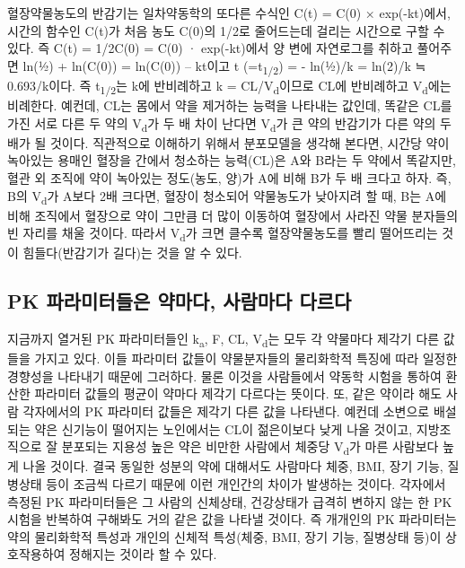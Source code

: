 \documentclass[
  11pt,
  krantz2, a4paper, twoside]{krantz}
\theoremstyle{definition}
\theoremstyle{definition}
\theoremstyle{definition}
\theoremstyle{definition}
\theoremstyle{remark}
\begin{document}
혈장약물농도의 반감기는 일차약동학의 또다른 수식인 C(t) = C(0) × exp(-kt)에서, 시간의 함수인 C(t)가 처음 농도 C(0)의 1/2로 줄어드는데 걸리는 시간으로 구할 수 있다. 
즉 C(t) = 1/2C(0) = C(0) · exp(-kt)에서 양 변에 자연로그를 취하고 풀어주면 ln(½) + ln(C(0)) = ln(C(0)) -- kt이고 t (=t\textsubscript{1/2}) = - ln(½)/k = ln(2)/k ≒ 0.693/k이다.
즉 t\textsubscript{1/2}는 k에 반비례하고 k = CL/V\textsubscript{d}이므로 CL에 반비례하고 V\textsubscript{d}에는 비례한다.
예컨데, CL는 몸에서 약을 제거하는 능력을 나타내는 값인데, 똑같은 CL를 가진 서로 다른 두 약의 V\textsubscript{d}가 두 배 차이 난다면 V\textsubscript{d}가 큰 약의 반감기가 다른 약의 두 배가 될 것이다. 
직관적으로 이해하기 위해서 분포모델을 생각해 본다면, 시간당 약이 녹아있는 용매인 혈장을 간에서 청소하는 능력(CL)은 A와 B라는 두 약에서 똑같지만, 혈관 외 조직에 약이 녹아있는 정도(농도, 양)가 A에 비해 B가 두 배 크다고 하자.
즉, B의 V\textsubscript{d}가 A보다 2배 크다면, 혈장이 청소되어 약물농도가 낮아지려 할 때, B는 A에 비해 조직에서 혈장으로 약이 그만큼 더 많이 이동하여 혈장에서 사라진 약물 분자들의 빈 자리를 채울 것이다.
따라서 V\textsubscript{d}가 크면 클수록 혈장약물농도를 빨리 떨어뜨리는 것이 힘들다(반감기가 길다)는 것을 알 수 있다.

\hypertarget{pk-uxd30cuxb77cuxbbf8uxd130uxb4e4uxc740-uxc57duxb9c8uxb2e4-uxc0acuxb78cuxb9c8uxb2e4-uxb2e4uxb974uxb2e4}{%
\subsection{PK 파라미터들은 약마다, 사람마다 다르다}\label{pk-uxd30cuxb77cuxbbf8uxd130uxb4e4uxc740-uxc57duxb9c8uxb2e4-uxc0acuxb78cuxb9c8uxb2e4-uxb2e4uxb974uxb2e4}}

지금까지 열거된 PK 파라미터들인 k\textsubscript{a}, F, CL, V\textsubscript{d}는 모두 각 약물마다 제각기 다른 값들을 가지고 있다.
이들 파라미터 값들이 약물분자들의 물리화학적 특징에 따라 일정한 경향성을 나타내기 때문에 그러하다.
물론 이것을 사람들에서 약동학 시험을 통하여 환산한 파라미터 값들의 평균이
약마다 제각기 다르다는 뜻이다.
또, 같은 약이라 해도 사람 각자에서의 PK 파라미터 값들은 제각기 다른 값을 나타낸다.
예컨데 소변으로 배설되는 약은 신기능이 떨어지는 노인에서는 CL이 젊은이보다 낮게 나올 것이고, 지방조직으로 잘 분포되는 지용성 높은 약은 비만한 사람에서 체중당 V\textsubscript{d}가 마른 사람보다 높게 나올 것이다.
결국 동일한 성분의 약에 대해서도
사람마다 체중, BMI, 장기 기능, 질병상태 등이 조금씩 다르기 때문에 이런 개인간의 차이가 발생하는 것이다.
각자에서 측정된 PK 파라미터들은 그 사람의 신체상태, 건강상태가 급격히 변하지 않는 한 PK 시험을 반복하여 구해봐도 거의 같은 값을 나타낼 것이다.
즉 개개인의 PK 파라미터는 약의 물리화학적 특성과 개인의 신체적 특성(체중, BMI, 장기 기능, 질병상태 등)이 상호작용하여 정해지는 것이라 할 수 있다.
\end{document}
